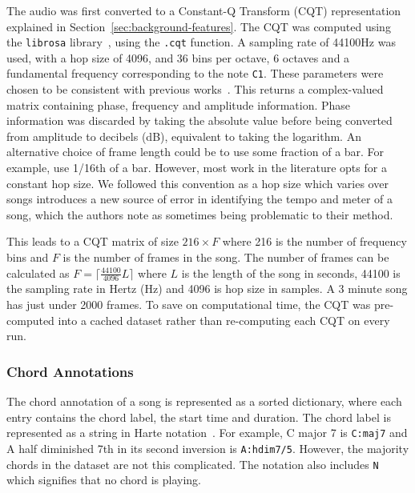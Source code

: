 The audio was first converted to a Constant-Q Transform (CQT) representation explained in Section~\ref{sec:background-features}. The CQT was computed using the \texttt{librosa} library~\citep{librosa}, using the \texttt{.cqt} function. A sampling rate of 44100Hz was used, with a hop size of 4096, and 36 bins per octave, 6 octaves and a fundamental frequency corresponding to the note \texttt{C1}. These parameters were chosen to be consistent with previous works~\citep{StructuredTraining}. This returns a complex-valued matrix containing phase, frequency and amplitude information. Phase information was discarded by taking the absolute value before being converted from amplitude to decibels (dB), equivalent to taking the logarithm. An alternative choice of frame length could be to use some fraction of a bar. For example, \citet{MelodyTranscriptionViaGenerativePreTraining} use 1/16th of a bar. However, most work in the literature opts for a constant hop size. We followed this convention as a hop size which varies over songs introduces a new source of error in identifying the tempo and meter of a song, which the authors note as sometimes being problematic to their method.

This leads to a CQT matrix of size $216 \times F$ where 216 is the number of frequency bins and $F$ is the number of frames in the song. The number of frames can be calculated as $F = \lceil \frac{44100}{4096} L  \rceil$ where $L$ is the length of the song in seconds, 44100 is the sampling rate in Hertz (Hz) and 4096 is hop size in samples. A 3 minute song has just under 2000 frames. To save on computational time, the CQT was pre-computed into a cached dataset rather than re-computing each CQT on every run.

\subsubsection{Chord Annotations}\label{sec:chord-annotations}

The chord annotation of a song is represented as a sorted dictionary, where each entry contains the chord label, the start time and duration. The chord label is represented as a string in Harte notation~\citep{HarteNotation}. For example, C major 7 is \texttt{C:maj7} and A half diminished 7th in its second inversion is \texttt{A:hdim7/5}. However, the majority chords in the dataset are not this complicated. The notation also includes \texttt{N} which signifies that no chord is playing. 

